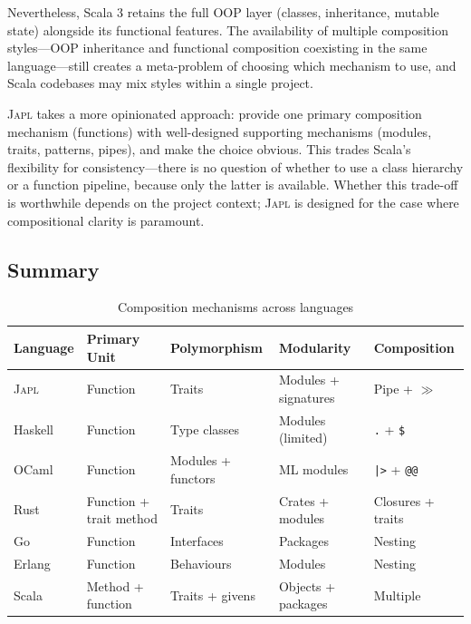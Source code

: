 \documentclass[11pt,a4paper]{article}
\newcommand{\japl}{\textsc{Japl}}
\begin{document}
Nevertheless, Scala 3 retains the full OOP layer (classes, inheritance, mutable state) alongside its functional features. The availability of multiple composition styles---OOP inheritance and functional composition coexisting in the same language---still creates a meta-problem of choosing which mechanism to use, and Scala codebases may mix styles within a single project.

\japl{} takes a more opinionated approach: provide one primary composition mechanism (functions) with well-designed supporting mechanisms (modules, traits, patterns, pipes), and make the choice obvious. This trades Scala's flexibility for consistency---there is no question of whether to use a class hierarchy or a function pipeline, because only the latter is available. Whether this trade-off is worthwhile depends on the project context; \japl{} is designed for the case where compositional clarity is paramount.

\subsection{Summary}

\begin{table}[H]
\centering
\caption{Composition mechanisms across languages}
\label{tab:comparison}
\begin{tabularx}{\textwidth}{lXXXX}
\toprule
\textbf{Language} & \textbf{Primary Unit} & \textbf{Polymorphism} & \textbf{Modularity} & \textbf{Composition} \\
\midrule
\japl{} & Function & Traits & Modules + signatures & Pipe + $\gg$ \\
Haskell & Function & Type classes & Modules (limited) & \texttt{.} + \texttt{\$} \\
OCaml & Function & Modules + functors & ML modules & \texttt{|>} + \texttt{@@} \\
Rust & Function + trait method & Traits & Crates + modules & Closures + traits \\
Go & Function & Interfaces & Packages & Nesting \\
Erlang & Function & Behaviours & Modules & Nesting \\
Scala & Method + function & Traits + givens & Objects + packages & Multiple \\
\bottomrule
\end{tabularx}
\end{table}


\end{document}
